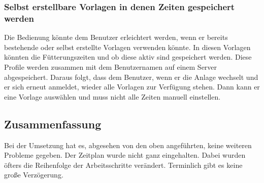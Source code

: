 \subsubsection{Selbst erstellbare Vorlagen in denen Zeiten gespeichert werden}
Die Bedienung könnte dem Benutzer erleichtert werden, wenn er bereits bestehende oder selbst erstellte Vorlagen verwenden könnte. In diesen Vorlagen könnten die Fütterungszeiten und ob diese aktiv sind gespeichert werden. Diese Profile werden zusammen mit dem Benutzernamen auf einem Server abgespeichert. Daraus folgt, dass dem Benutzer, wenn er die Anlage wechselt und er sich erneut anmeldet, wieder alle Vorlagen zur Verfügung stehen. Dann kann er eine Vorlage auswählen und muss nicht alle Zeiten manuell einstellen.

\subsection{Zusammenfassung}
Bei der Umsetzung hat es, abgesehen von den oben angeführten, keine weiteren Probleme gegeben. Der Zeitplan wurde nicht ganz eingehalten. Dabei wurden öfters die Reihenfolge der Arbeitsschritte verändert. Terminlich gibt es keine große Verzögerung.